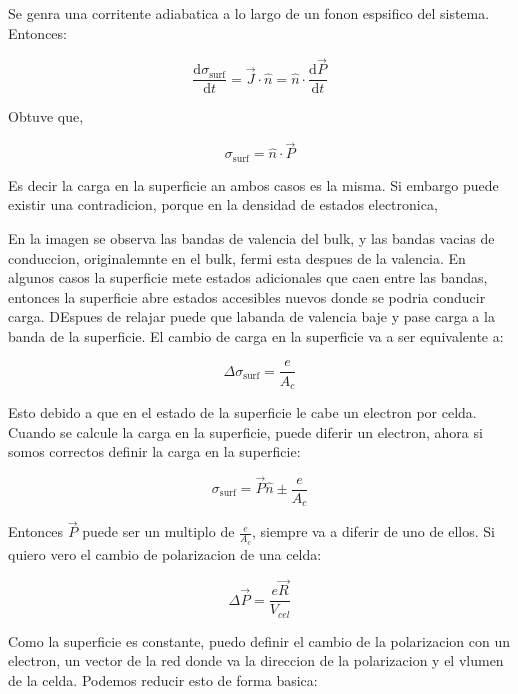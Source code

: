 \documentclass[11pt,fleqn]{book}
\begin{document}

Se genra una corritente adiabatica a lo largo de un fonon espsifico del sistema. Entonces:

\begin{equation}
    \frac{\mathrm{d}\sigma_{\text{surf}}}{\mathrm{d}t}=\vec{J}\cdot\hat{n}=\hat{n}\cdot\frac{\mathrm{d}\vec{P}}{\mathrm{d}t}
\end{equation}

Obtuve que,

\begin{equation}
    \sigma_{\text{surf}}=\hat{n}\cdot\vec{P}
\end{equation}

Es decir la carga en la superficie an ambos casos es la misma. Si embargo puede existir una contradicion, porque en la densidad de estados electronica,


En la imagen se observa las bandas de valencia del bulk, y las bandas vacias de conduccion, originalemnte en el bulk, fermi esta despues de la valencia. En algunos casos la superficie mete estados adicionales que caen entre las bandas, entonces la superficie abre estados accesibles nuevos donde se podria conducir carga. DEspues de relajar puede que labanda de valencia baje y pase carga a la banda de la superficie. El cambio de carga en la superficie va a ser equivalente a:

\begin{equation}
    \Delta\sigma_{\text{surf}}=\frac{e}{A_{c}}
\end{equation}

Esto debido a que en el estado de la superficie le cabe un electron por celda. Cuando se calcule la carga en la superficie, puede diferir un electron, ahora si somos correctos definir la carga en la superficie:

\begin{equation}
    \sigma_{\text{surf}}=\vec{P}\hat{n}\pm\frac{e}{A_{c}}
\end{equation}

Entonces $\vec{P}$ puede ser un multiplo de $\frac{e}{A_{c}}$, siempre va a diferir de uno de ellos. Si quiero vero el cambio de polarizacion de una celda:

\begin{equation}
    \Delta\vec{P}=\frac{e\vec{R}}{V_{cel}}
\end{equation}

Como la superficie es constante, puedo definir el cambio de la polarizacion con un electron, un vector de la red donde va la direccion de la polarizacion y el vlumen de la celda. Podemos reducir esto de forma basica:
\end{document}
